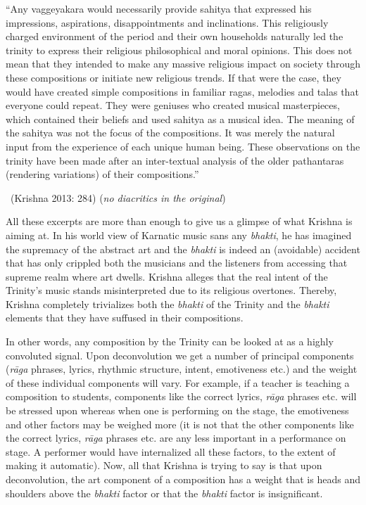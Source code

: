 \begin{myquote}
“Any vaggeyakara would necessarily provide sahitya that expressed his impressions, aspirations, disappointments and inclinations. This religiously charged environment of the period and their own households naturally led the trinity to express their religious philosophical and moral opinions. This does not mean that they intended to make any massive religious impact on society through these compositions or initiate new religious trends. If that were the case, they would have created simple compositions in familiar ragas, melodies and talas that everyone could repeat. They were geniuses who created musical masterpieces, which contained their beliefs and used sahitya as a musical idea. The meaning of the sahitya was not the focus of the compositions. It was merely the natural input from the experience of each unique human being. These observations on the trinity have been made after an inter-textual analysis of the older pathantaras (rendering variations) of their compositions.” 

~\hfill (Krishna 2013: 284) (\textit{no diacritics in the original})
\end{myquote}

All these excerpts are more than enough to give us a glimpse of what Krishna is aiming at. In his world view of Karnatic music sans any \textit{bhakti}, he has imagined the supremacy of the abstract art and the \textit{bhakti} is indeed an (avoidable) accident that has only crippled both the musicians and the listeners from accessing that supreme realm where art dwells. Krishna alleges that the real intent of the Trinity’s music stands misinterpreted due to its religious overtones. Thereby, Krishna completely trivializes both the \textit{bhakti} of the Trinity and the \textit{bhakti} elements that they have suffused in their compositions.

In other words, any composition by the Trinity can be looked at as a highly convoluted signal. Upon deconvolution we get a number of principal components (\textit{rāga} phrases, lyrics, rhythmic structure, intent, emotiveness etc.) and the weight of these individual components will vary. For example, if a teacher is teaching a composition to students, components like the correct lyrics, \textit{rāga} phrases etc. will be stressed upon whereas when one is performing on the stage, the emotiveness and other factors may be weighed more (it is not that the other components like the correct lyrics, \textit{rāga} phrases etc. are any less important in a performance on stage. A performer would have internalized all these factors, to the extent of making it automatic). Now, all that Krishna is trying to say is that upon deconvolution, the art component of a composition has a weight that is heads and shoulders above the \textit{bhakti} factor or that the \textit{bhakti} factor is insignificant.

